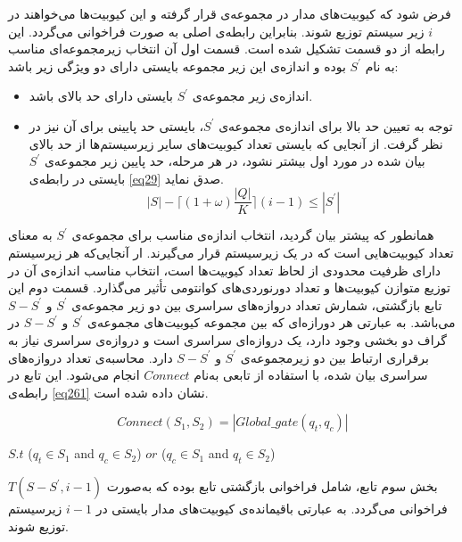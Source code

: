 \begin{itemize}
فرض شود که کیوبیت‌های مدار در مجموعه‌ی   قرار گرفته و این کیوبیت‌ها می‌خواهند در $i$ زیر سیستم توزیع شوند. بنابراین رابطه‌ی اصلی به صورت  فراخوانی می‌گردد. این رابطه از دو قسمت تشکیل شده است. قسمت اول آن انتخاب زیرمجموعه‌ای مناسب به نام $S^{'}$ بوده و اندازه‌ی این زیر مجموعه بایستی دارای دو ویژگی زیر باشد:
\begin{itemize}
\item
اندازه‌ی زیر مجموعه‌ی $S^{'}$ بایستی دارای حد بالای  باشد.
\item
 توجه به تعیین حد بالا برای اندازه‌ی مجموعه‌ی $S^{'}$، بایستی حد پایینی برای آن نیز در نظر گرفت. از آنجایی که بایستی تعداد کیوبیت‌های سایر زیرسیستم‌ها از حد بالای بیان شده در مورد اول بیشتر نشود، در هر مرحله، حد پایین زیر مجموعه‌ی $S^{'}$ بایستی در رابطه‌ی \eqref{eq29} صدق نماید. 
\begin{equation}
|S|-\lceil(1+\omega)\frac{|Q|}{K}\rceil(i-1) \leq|S^{'}|
\label{eq29}
\end{equation}

\end{itemize}

همانطور که پیشتر بیان گردید، انتخاب اندازه‌ی مناسب برای مجموعه‌‌ی  $S^{'}$  به معنای تعداد کیوبیت‌هایی است که در یک زیرسیستم قرار می‌گیرند. ار آنجایی‌که هر زیرسیستم دارای ظرفیت محدودی از لحاظ تعداد کیوبیت‌ها است، انتخاب مناسب اندازه‌ی آن در توزیع متوازن کیوبیت‌ها و تعداد دورنوردی‌های کوانتومی تأثیر می‌گذارد.
قسمت دوم این تابع بازگشتی، شمارش تعداد دروازه‌های سراسری بین دو زیر مجموعه‌‌ی $S^{'}$ و $S-S^{'} $ می‌باشد. به عبارتی هر دورازه‌ای که بین مجموعه‌ کیوبیت‌های مجموعه‌ی $S^{'}$ و $S-S^{'} $ در گراف دو بخشی وجود دارد، یک دروازه‌ای سراسری است و دروازه‌ی سراسری نیاز به برقراری ارتباط بین دو زیرمجموعه‌ی $S^{'}$ و $S-S^{'} $ دارد. محاسبه‌ی تعداد دروازه‌های سراسری بیان شده، با استفاده از تابعی به‌نام $Connect$ انجام می‌شود. این تابع در رابطه‌ی \eqref{eq261} نشان داده شده است.


\begin {equation}
 Connect (S_{1},S_{2})=| Global\_gate(q_{t},q_{c})|
\label{eq261}
\end{equation}
\begin{center}
\begin{latin}
 $S.t$      ($q_{t} \in S_{1}$  and  $q_{c}\in S_{2}$)    $or$       ($q_{c} \in S_{1}$ and  $q_{t}\in S_{2}$)
 \end{latin}
\end{center}
\end{itemize}
بخش سوم تابع، شامل فراخوانی بازگشتی تابع بوده که به‌صورت $T(S-S^{'},i-1)$ فراخوانی می‌گردد. به عبارتی باقیمانده‌ی کیوبیت‌های مدار بایستی در $i-1 $ زیرسیستم توزیع شوند. 
